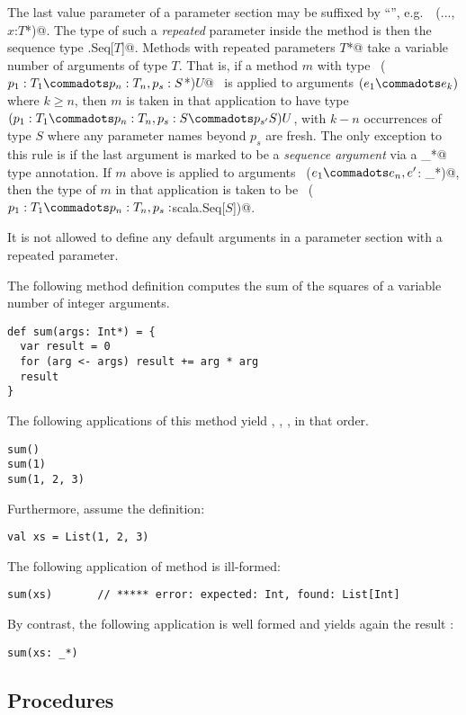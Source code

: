 The last value parameter of a parameter section may be suffixed by
``\code{*}'', e.g.\ ~\lstinline@(..., $x$:$T$*)@.  The type of such a
{\em repeated} parameter inside the method is then the sequence type
\lstinline@scala.Seq[$T$]@.  Methods with repeated parameters
\lstinline@$T$*@ take a variable number of arguments of type $T$.
That is, if a method $m$ with type ~\lstinline@($p_1:T_1 \commadots p_n:T_n,
p_s:S$*)$U$@~ is applied to arguments $(e_1 \commadots e_k)$ where $k \geq
n$, then $m$ is taken in that application to have type $(p_1:T_1
\commadots p_n:T_n, p_s:S \commadots p_{s'}S)U$, with $k - n$ occurrences of type
$S$ where any parameter names beyond $p_s$ are fresh. The only exception to this rule is if the last argument is
marked to be a {\em sequence argument} via a \lstinline@_*@ type
annotation. If $m$ above is applied to arguments
~\lstinline@($e_1 \commadots e_n, e'$: _*)@, then the type of $m$ in
that application is taken to be 
~\lstinline@($p_1:T_1\commadots p_n:T_n,p_{s}:$scala.Seq[$S$])@.

It is not allowed to define any default arguments in a parameter section
with a repeated parameter.

\example The following method definition computes the sum of the squares of a variable number
of integer arguments.
\begin{lstlisting}
def sum(args: Int*) = {
  var result = 0
  for (arg <- args) result += arg * arg
  result
}
\end{lstlisting}
The following applications of this method yield , ,
, in that order.
\begin{lstlisting}
sum()
sum(1)
sum(1, 2, 3)
\end{lstlisting}
Furthermore, assume the definition:
\begin{lstlisting}
val xs = List(1, 2, 3)
\end{lstlisting}
The following application of method \lstinline@sum@ is ill-formed:
\begin{lstlisting}
sum(xs)       // ***** error: expected: Int, found: List[Int]
\end{lstlisting}
By contrast, the following application is well formed and yields again
the result :
\begin{lstlisting}
sum(xs: _*) 
\end{lstlisting}

\subsection{Procedures}\label{sec:procedures}


